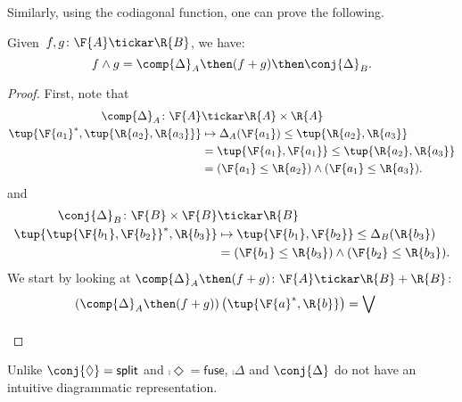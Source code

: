 Similarly, using the codiagonal function, one can prove the following.
\begin{lemma}
    Given~$f, g\colon \F{A} \tickar \R{B}$, we have:
    \begin{equation}
        f \wedge g = \comp{\Delta}_A \then(f + g) \then \conj{\Delta}_B.
    \end{equation}
\end{lemma}
\begin{proof}
First, note that
\begin{equation}
    \begin{aligned}
    \comp{\Delta}_A \colon \F{A}&\tickar \R{A}\times \R{A}\\
    \tup{\F{a_1}^*,\tup{\R{a_2},\R{a_3}}}&\mapsto \Delta_A(\F{a_1})\leq \tup{\R{a_2},\R{a_3}}\\
    &= \tup{\F{a_1},\F{a_1}}\leq \tup{\R{a_2},\R{a_3}}\\
    &= (\F{a_1}\leq \R{a_2}) \wedge (\F{a_1}\leq \R{a_3}).
    \end{aligned}
\end{equation}
and
\begin{equation}
    \begin{aligned}
    \conj{\Delta}_B \colon \F{B}\times \F{B}&\tickar \R{B}\\
    \tup{\tup{\F{b_1},\F{b_2}}^*,\R{b_3}}&\mapsto \tup{\F{b_1},\F{b_2}}\leq \Delta_B(\R{b_3})\\
    &= (\F{b_1}\leq \R{b_3}) \wedge (\F{b_2}\leq \R{b_3}).
    \end{aligned}
\end{equation}
We start by looking at $\comp{\Delta}_A \then (f+g) \colon \F{A}\tickar \R{B}+\R{B}$:
\begin{equation}
    \begin{aligned}
    \left(\comp{\Delta}_A\then (f+g)\right)\left(\tup{\F{a}^*,\R{b}}\right)&=\bigvee_{}
    \end{aligned}
\end{equation}
\end{proof}
Unlike $\conj{\Diamond} = \mathsf{split}$ and $\comp{\Diamond} = \mathsf{fuse}$, $\comp{\Delta}$ and $\conj{\Delta}$ do not have an intuitive diagrammatic representation.
